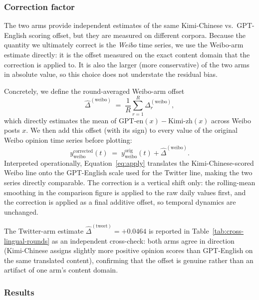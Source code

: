 \subsubsection{Correction factor}

The two arms provide independent estimates of the same Kimi-Chinese
vs.\ GPT-English scoring offset, but they are measured on different
corpora. Because the quantity we ultimately correct is the
\emph{Weibo} time series, we use the Weibo-arm estimate directly: it is
the offset measured on the exact content domain that the correction is
applied to. It is also the larger (more conservative) of the two arms
in absolute value, so this choice does not understate the residual
bias.

Concretely, we define the round-averaged Weibo-arm offset
\begin{equation}
\widehat{\Delta}^{(\text{weibo})} \;=\; \frac{1}{R} \sum_{r=1}^{R}
\Delta^{(\text{weibo})}_r,
\label{eq:correction}
\end{equation}
which directly estimates the mean of $\text{GPT-en}(x) -
\text{Kimi-zh}(x)$ across Weibo posts $x$. We then add this offset
(with its sign) to every value of the original Weibo opinion time
series before plotting:
\begin{equation}
y^{\text{corrected}}_{\text{weibo}}(t) \;=\; y^{\text{orig}}_{\text{weibo}}(t)
+ \widehat{\Delta}^{(\text{weibo})}.
\label{eq:apply}
\end{equation}
Interpreted operationally,
Equation~\eqref{eq:apply} translates the Kimi-Chinese-scored Weibo line
onto the GPT-English scale used for the Twitter line, making the two
series directly comparable. The correction is a vertical shift only:
the rolling-mean smoothing in the comparison figure is applied to the
raw daily values first, and the correction is applied as a final
additive offset, so temporal dynamics are unchanged.

The Twitter-arm estimate
$\widehat{\Delta}^{(\text{tweet})} = +0.0464$ is reported in
Table~\ref{tab:cross-lingual-rounds} as an independent cross-check:
both arms agree in direction (Kimi-Chinese assigns slightly more
positive opinion scores than GPT-English on the same translated
content), confirming that the offset is genuine rather than an
artifact of one arm's content domain.

\subsubsection{Results}

